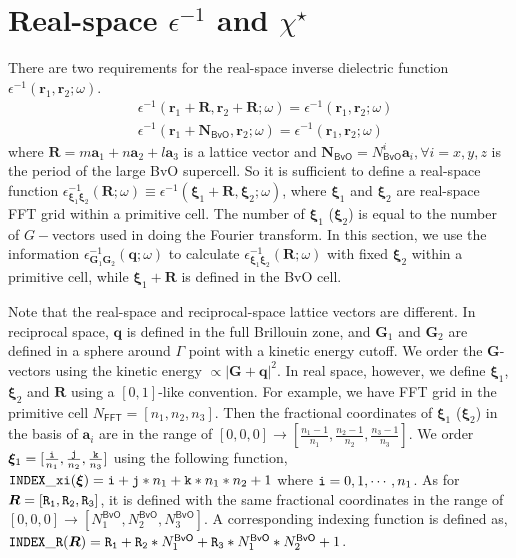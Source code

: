 \documentclass[11pt, oneside]{article}          %
\begin{document}
\section{Real-space $\epsilon^{-1}$ and $\chi^{\star}$}
\label{sec:real-space-epsilon}

There are two requirements for the real-space inverse dielectric function $\epsilon^{-1}({\bm r}_1, {\bm r}_2; \omega)$.
\begin{equation}
  \label{eq:two_conditions}
  \begin{aligned}
    & \epsilon^{-1}({\bm r}_1+{\bm R},{\bm r}_2+{\bm R};\omega) = \epsilon^{-1}({\bm r}_1,{\bm r}_2;\omega) \\
    & \epsilon^{-1}({\bm r}_1+{\bm N}_{\mathsf{BvO}},{\bm r}_2;\omega) = \epsilon^{-1}({\bm r}_1,{\bm r}_2;\omega)
  \end{aligned}
\end{equation}
where ${\bm R}=m {\bm a}_1 + n {\bm a}_2 + l {\bm a}_3$ is a lattice vector and ${\bm N}_{\mathsf{BvO}} = N^{i}_{\mathsf{BvO}} {\bm a}_i, \forall i=x,y,z$ is the period of the large BvO supercell. So it is sufficient to define a real-space function $\epsilon^{-1}_{{\bm \xi}_1 {\bm \xi}_2}({\bm R}; \omega) \equiv \epsilon^{-1}({\bm \xi}_1 + {\bm R}, {\bm \xi}_2; \omega)$, where ${\bm \xi}_1$ and ${\bm \xi}_2$ are real-space FFT grid within a primitive cell. The number of ${\bm \xi}_1$ (${\bm \xi}_2$) is equal to the number of $G-$vectors used in doing the Fourier transform. In this section, we use the information $\epsilon^{-1}_{{\bm G}_1 {\bm G}_2}({\bm q}; \omega)$ to calculate $\epsilon^{-1}_{{\bm \xi}_1 {\bm \xi}_2} ({\bm R}; \omega)$ with fixed ${\bm \xi}_2$ within a primitive cell, while ${\bm \xi}_1+{\bm R}$ is defined in the BvO cell.

Note that the real-space and reciprocal-space lattice vectors are different. In reciprocal space, ${\bm q}$ is defined in the full Brillouin zone, and ${\bm G}_1$ and ${\bm G}_2$ are defined in a sphere around $\Gamma$ point with a kinetic energy cutoff. We order the ${\bm G}$-vectors using the kinetic energy $\propto |{\bm G}+{\bm q}|^2$. In real space, however, we define ${\bm \xi}_1$, ${\bm \xi}_2$ and ${\bm R}$ using a $[0,1]$-like convention. For example, we have FFT grid in the primitive cell $N_{\mathsf{FFT}} = [n_1,n_2,n_3]$. Then the fractional coordinates of ${\bm \xi}_1$ (${\bm \xi}_2$) in the basis of ${\bm a}_i$ are in the range of $[0,0,0] \rightarrow [\frac{n_1-1}{n_1},\frac{n_2-1}{n_2},\frac{n_3-1}{n_3}]$. We order ${\bm \xi}_1=[\frac{\tt i}{n_1},\frac{\tt j}{n_2},\frac{\tt k}{n_3}]$ using the following function, ${\tt INDEX\_xi}({\bm \xi}) = {\tt i} + {\tt j} * n_1 + {\tt k} * n_1 * n_2+1$ where ${\tt i} = 0, 1, \cdots, n_1$. As for ${\bm R}=[{\tt R_1}, {\tt R_2}, {\tt R_3}]$, it is defined with the same fractional coordinates in the range of $[0,0,0] \rightarrow [N^{\mathsf{BvO}}_1,N^{\mathsf{BvO}}_2,N^{\mathsf{BvO}}_3]$. A corresponding indexing function is defined as, ${\tt INDEX\_R}({\bm R}) = {\tt R_1} + {\tt R_2} * N^{\mathsf{BvO}}_1 + {\tt R_3} * N^{\mathsf{BvO}}_1 * N^{\mathsf{BvO}}_2 + 1$.
\end{document}
